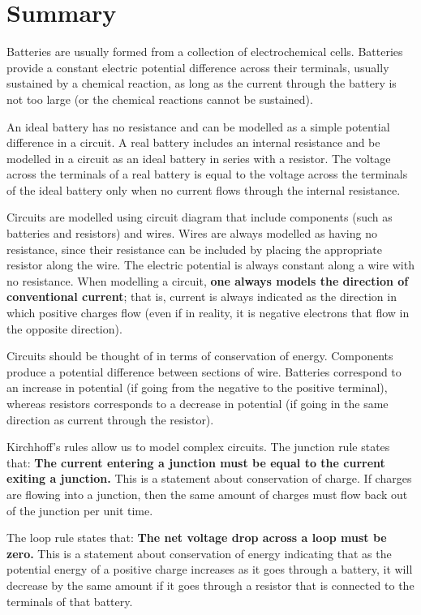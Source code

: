 \section{Summary}
\begin{chapterSummary}
Batteries are usually formed from a collection of electrochemical cells. Batteries provide a constant electric potential difference across their terminals, usually sustained by a chemical reaction, as long as the current through the battery is not too large (or the chemical reactions cannot be sustained). 

An ideal battery has no resistance and can be modelled as a simple potential difference in a circuit. A real battery includes an internal resistance and be modelled in a circuit as an ideal battery in series with a resistor. The voltage across the terminals of a real battery is equal to the voltage across the terminals of the ideal battery only when no current flows through the internal resistance. 

Circuits are modelled using circuit diagram that include components (such as batteries and resistors) and wires. Wires are always modelled as having no resistance, since their resistance can be included by placing the appropriate resistor along the wire. The electric potential is always constant along a wire with no resistance. When modelling a circuit, \textbf{one always models the direction of conventional current}; that is, current is always indicated as the direction in which positive charges flow (even if in reality, it is negative electrons that flow in the opposite direction).

Circuits should be thought of in terms of conservation of energy. Components produce a potential difference between sections of wire. Batteries correspond to an increase in potential (if going from the negative to the positive terminal), whereas resistors corresponds to a decrease in potential (if going in the same direction as current through the resistor). 

Kirchhoff's rules allow us to model complex circuits. The junction rule states that: \textbf{The current entering a junction must be equal to the current exiting a junction.} This is a statement about conservation of charge. If charges are flowing into a junction, then the same amount of charges must flow back out of the junction per unit time.

The loop rule states that: \textbf{The net voltage drop across a loop must be zero.} This is a statement about conservation of energy indicating that as the potential energy of a positive charge increases as it goes through a battery, it will decrease by the same amount if it goes through a resistor that is connected to the terminals of that battery.


\end{chapterSummary}
